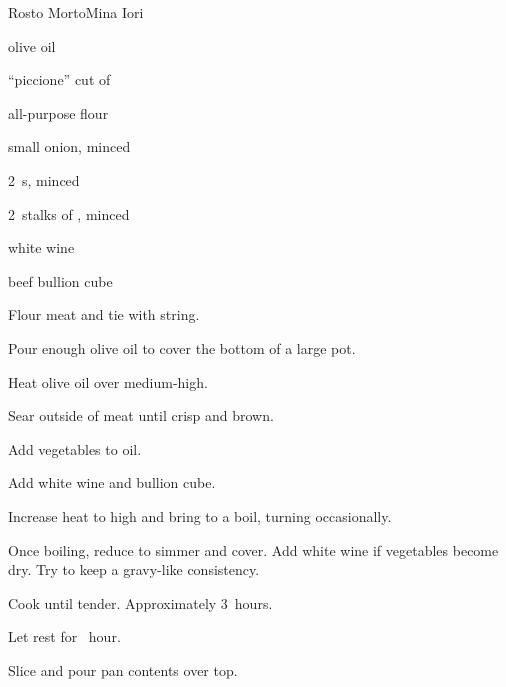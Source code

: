 \begin{recipe}{Rosto Morto}{Mina Iori}{}

\begin{ingredients}
\item olive oil
\item \kgr{1\half} ``piccione'' cut of 
\item all-purpose flour
\item small onion, minced
\item 2~s, minced
\item 2~stalks of , minced
\item white wine
\item beef bullion cube
\end{ingredients}

\begin{directions}
\item Flour meat and tie with string.
\item Pour enough olive oil to cover the bottom of a large pot.
\item Heat olive oil over medium-high.
\item Sear outside of meat until crisp and brown.
\item Add vegetables to oil.
\item Add white wine and bullion cube.
\item Increase heat to high and bring to a boil, turning occasionally.
\item Once boiling, reduce to simmer and cover. Add white wine if vegetables become dry. Try to keep a gravy-like consistency.
\item Cook until tender. Approximately 3~hours.
\item Let rest for \half~hour.
\item Slice and pour pan contents over top.
\end{directions}

\hint{}
\end{recipe}
